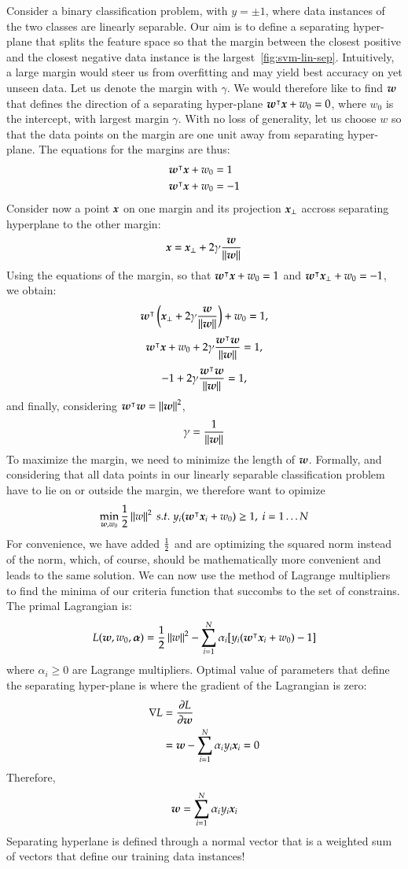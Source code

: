 \begin{refsection}
Consider a binary classification problem, with $y=\pm 1$, where data instances of the two classes are linearly separable. Our aim is to define a separating hyper-plane that splits the feature space so that the margin between the closest positive and the closest negative data instance is the largest~\ref{fig:svm-lin-sep}. Intuitively, a large margin would steer us from overfitting and may yield best accuracy on yet unseen data. Let us denote the margin with $\gamma$. We would therefore like to find $\boldsymbol{w}$ that defines the direction of a separating hyper-plane $\boldsymbol{w}^\intercal\boldsymbol{x}+w_0=0$, where $w_0$ is the intercept, with largest margin $\gamma$. With no loss of generality, let us choose $w$ so that the data points on the margin are one unit away from separating hyper-plane. The equations for the margins are thus:
\begin{align*}
\boldsymbol{w}^\intercal\boldsymbol{x}+w_0 &= 1 \\
\boldsymbol{w}^\intercal\boldsymbol{x}+w_0 &= -1 \\
\end{align*}
Consider now a point $\boldsymbol{x}$ on one margin and its projection $\boldsymbol{x}_\perp$ accross separating hyperplane to the other margin:
$$ \boldsymbol{x} = \boldsymbol{x}_\perp + 2\gamma {\boldsymbol{w}\over\left\lVert\boldsymbol{w}\right\rVert} $$
Using the equations of the margin, so that $\boldsymbol{w}^\intercal\boldsymbol{x}+w_0 = 1$ and $\boldsymbol{w}^\intercal\boldsymbol{x}_\perp+w_0 = -1$, we obtain:
$$ \boldsymbol{w}^\intercal\left(\boldsymbol{x}_\perp + 2\gamma {\boldsymbol{w}\over\left\lVert\boldsymbol{w}\right\rVert}\right) + w_0=1, $$
$$ \boldsymbol{w}^\intercal\boldsymbol{x} + w_0 + 2\gamma {\boldsymbol{w}^\intercal\boldsymbol{w}\over\left\lVert\boldsymbol{w}\right\rVert}
= 1, $$
$$ -1 + 2\gamma {\boldsymbol{w}^\intercal\boldsymbol{w}\over\left\lVert\boldsymbol{w}\right\rVert}
= 1, $$
and finally, considering $\boldsymbol{w}^\intercal\boldsymbol{w}=\left\lVert\boldsymbol{w}\right\rVert^2 $,
$$ \gamma = {1\over\left\lVert\boldsymbol{w}\right\rVert} $$
To maximize the margin, we need to minimize the length of $\boldsymbol{w}$. Formally, and considering that all data points in our linearly separable classification problem have to lie on or outside the margin, we therefore want to opimize
$$\min_{\vect{w},w_0} {1\over 2}\norm{w}^2\ s.t.\ y_i(\vect{w}^\tr \vect{x}_i+w_0)\geq 1,\ i=1\ldots N$$
For convenience, we have added $1\over 2$ and are optimizing the squared norm instead of the norm, which, of course, should be mathematically more convenient and leads to the same solution. We can now use the method of Lagrange multipliers to find the minima of our criteria function that succombs to the set of constrains. The primal Lagrangian is:
$$ L(\boldsymbol{w},w_0,\boldsymbol{\alpha})={1\over 2}\left\lVert w\right\rVert^2 - \sum_{i=1}^N \alpha_i [y_i(\boldsymbol{w}^\intercal \boldsymbol{x}_i+w_0)-1] $$
where $\alpha_i\geq 0$ are Lagrange multipliers. Optimal value of parameters that define the separating hyper-plane is where the gradient of the Lagrangian is zero:
\begin{align*}
\nabla L &= \frac{\partial L}{\partial\boldsymbol{w}} \\
&= \boldsymbol{w} - \sum_{i=1}^N \alpha_i y_i \boldsymbol{x}_i = 0
\end{align*}
Therefore,
\begin{equation}
\boldsymbol{w}=\sum_{i=1}^N \alpha_i y_i \boldsymbol{x}_i
\label{eq:svm-w}
\end{equation}
Separating hyperlane is defined through a normal vector that is a weighted sum of vectors that define our training data instances!


\end{refsection}
